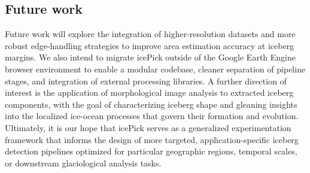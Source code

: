 \documentclass[11pt, letterpaper]{article}
\begin{document}
\subsection{Future work}

Future work will explore the integration of higher-resolution datasets and more robust edge-handling strategies to improve area estimation accuracy at iceberg margins. We also intend to migrate icePick outside of the Google Earth Engine browser environment to enable a modular codebase, cleaner separation of pipeline stages, and integration of external processing libraries. A further direction of interest is the
application of morphological image analysis to extracted iceberg components, with the goal of characterizing iceberg shape and gleaning insights into the localized ice-ocean processes that govern their formation and evolution. Ultimately, it is our hope that icePick serves as a generalized experimentation framework that informs the design of more targeted, application-specific iceberg detection pipelines optimized for particular geographic regions, temporal scales, or downstream glaciological analysis tasks.

\printbibliography
 
\end{document}
